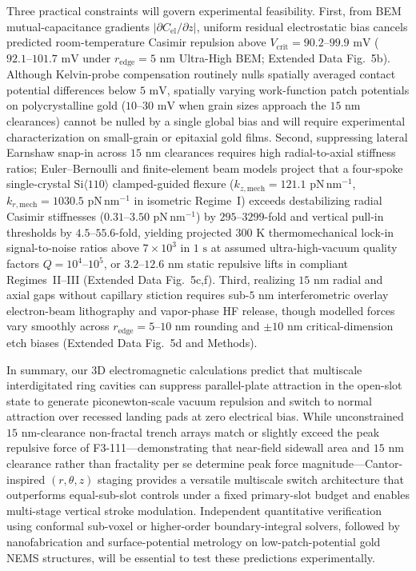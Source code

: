 \documentclass[11pt, a4paper]{article}
\begin{document}
Three practical constraints will govern experimental feasibility. First, from BEM mutual-capacitance gradients $|\partial C_{\mathrm{el}}/\partial z|$, uniform residual electrostatic bias cancels predicted room-temperature Casimir repulsion above $V_{\mathrm{crit}} = 90.2\text{--}99.9\text{ mV}$ ($92.1\text{--}101.7\text{ mV}$ under $r_{\mathrm{edge}}=5\text{ nm}$ Ultra-High BEM; Extended Data Fig.~5b). Although Kelvin-probe compensation routinely nulls spatially averaged contact potential differences below $5\text{ mV}$, spatially varying work-function patch potentials on polycrystalline gold ($10\text{--}30\text{ mV}$ when grain sizes approach the $15\text{ nm}$ clearances) cannot be nulled by a single global bias and will require experimental characterization on small-grain or epitaxial gold films. Second, suppressing lateral Earnshaw snap-in across $15\text{ nm}$ clearances requires high radial-to-axial stiffness ratios; Euler--Bernoulli and finite-element beam models project that a four-spoke single-crystal $\mathrm{Si}\langle 110\rangle$ clamped-guided flexure ($k_{z,\mathrm{mech}} = 121.1\text{ pN}\,\text{nm}^{-1}$, $k_{r,\mathrm{mech}} = 1030.5\text{ pN}\,\text{nm}^{-1}$ in isometric Regime~I) exceeds destabilizing radial Casimir stiffnesses ($0.31\text{--}3.50\text{ pN}\,\text{nm}^{-1}$) by $295\text{--}3299$-fold and vertical pull-in thresholds by $4.5\text{--}55.6$-fold, yielding projected $300\text{ K}$ thermomechanical lock-in signal-to-noise ratios above $7 \times 10^3$ in $1\text{ s}$ at assumed ultra-high-vacuum quality factors $Q = 10^4\text{--}10^5$, or $3.2\text{--}12.6\text{ nm}$ static repulsive lifts in compliant Regimes~II--III (Extended Data Fig.~5c,f). Third, realizing $15\text{ nm}$ radial and axial gaps without capillary stiction requires sub-$5\text{ nm}$ interferometric overlay electron-beam lithography and vapor-phase HF release, though modelled forces vary smoothly across $r_{\mathrm{edge}}=5\text{--}10\text{ nm}$ rounding and $\pm 10\text{ nm}$ critical-dimension etch biases (Extended Data Fig.~5d and Methods).

In summary, our 3D electromagnetic calculations predict that multiscale interdigitated ring cavities can suppress parallel-plate attraction in the open-slot state to generate piconewton-scale vacuum repulsion and switch to normal attraction over recessed landing pads at zero electrical bias. While unconstrained $15\text{ nm}$-clearance non-fractal trench arrays match or slightly exceed the peak repulsive force of F3-111---demonstrating that near-field sidewall area and $15\text{ nm}$ clearance rather than fractality per se determine peak force magnitude---Cantor-inspired $(r,\theta,z)$ staging provides a versatile multiscale switch architecture that outperforms equal-sub-slot controls under a fixed primary-slot budget and enables multi-stage vertical stroke modulation. Independent quantitative verification using conformal sub-voxel or higher-order boundary-integral solvers, followed by nanofabrication and surface-potential metrology on low-patch-potential gold NEMS structures, will be essential to test these predictions experimentally.
\end{document}
